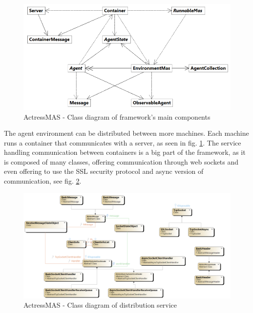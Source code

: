 \documentclass[0main.tex]{subfiles}
\begin{document}
\begin{figure}[htbp]
    \centering
    \includegraphics[width=.9\textwidth]{actress-environment2.png}
    \caption{ActressMAS - Class diagram of framework's main components \cite{Leon2022}}
    \label{actress-env}
\end{figure}

The agent environment can be distributed between more machines. Each machine runs a container that communicates with a 
server, as seen in fig. \ref{actress-env}. The service handling communication between containers is a big part of the 
framework, as it is composed of many classes, offering communication through web sockets and even offering to 
use the SSL security protocol and async version of communication, see fig. \ref{actress-distr}.

\begin{figure}[htbp]
    \centering
    \includegraphics[width=.99\textwidth]{ClassDiagram-actress-containers.png}
    \caption{ActressMAS - Class diagram of distribution service \cite{Leon2022}}
    \label{actress-distr}
\end{figure}
\end{document}
